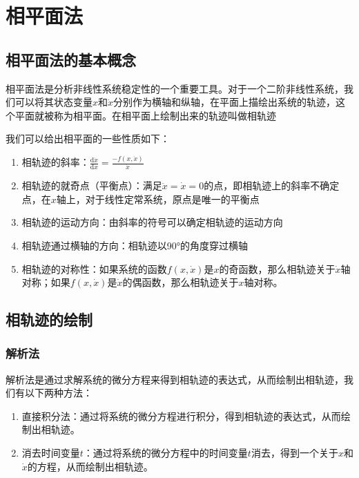 \section{相平面法}
\subsection{相平面法的基本概念}
相平面法是分析非线性系统稳定性的一个重要工具。对于一个二阶非线性系统，我们可以将其状态变量$x$和$\dot{x}$分别作为横轴和纵轴，在平面上描绘出系统的轨迹，这个平面就被称为相平面。在相平面上绘制出来的轨迹叫做相轨迹

我们可以给出相平面的一些性质如下：
\begin{property}[相平面的一些性质]
    \begin{enumerate}
        \item 相轨迹的斜率：$\frac{\mathrm{d}\dot{x}}{\mathrm{d}x}=\frac{-f(x,\dot{x})}{\dot{x}}$
        \item 相轨迹的就奇点（平衡点）：满足$\ddot{x} = \dot{x} = 0$的点，即相轨迹上的斜率不确定点，在$x$轴上，对于线性定常系统，原点是唯一的平衡点
        \item 相轨迹的运动方向：由斜率的符号可以确定相轨迹的运动方向
        \item 相轨迹通过横轴的方向：相轨迹以90°的角度穿过横轴
        \item 相轨迹的对称性：如果系统的函数$f(x,\dot{x})$是$x$的奇函数，那么相轨迹关于$\dot{x}$轴对称；如果$f(x,\dot{x})$是$\dot{x}$的偶函数，那么相轨迹关于$x$轴对称。
    \end{enumerate}
\end{property}

\subsection{相轨迹的绘制}

\subsubsection{解析法}
解析法是通过求解系统的微分方程来得到相轨迹的表达式，从而绘制出相轨迹，我们有以下两种方法：
\begin{enumerate}
    \item 直接积分法：通过将系统的微分方程进行积分，得到相轨迹的表达式，从而绘制出相轨迹。
    \item 消去时间变量$t$：通过将系统的微分方程中的时间变量$t$消去，得到一个关于$x$和$\dot{x}$的方程，从而绘制出相轨迹。
\end{enumerate}


